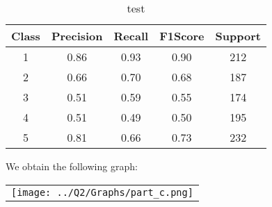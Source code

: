 \begin{enumerate}[label=(\alph*)]
\begin{enumerate}[label=\roman*.]
\begin{table}[!htb]
            \end{table}
        \begin{table}[!htb]
            \centering
            \begin{tabular}{ccccc}
            \hline
            Class & Precision & Recall & F1Score & Support \\ \hline
            1     & 0.86      & 0.93   & 0.90    & 212     \\
            2     & 0.66      & 0.70   & 0.68    & 187     \\
            3     & 0.51      & 0.59   & 0.55    & 174     \\
            4     & 0.51      & 0.49   & 0.50    & 195     \\
            5     & 0.81      & 0.66   & 0.73    & 232     \\ \hline
            \end{tabular}
            \caption{test}
            \label{part c test depth 4}
        \end{table}
        \newpage
        

    \end{enumerate}
    We obtain the following graph:
    \begin{center}
        \begin{tabular}{c}
            \texttt{[image: ../Q2/Graphs/part\_c.png]}
        \end{tabular}
    \end{center}


\end{enumerate}
